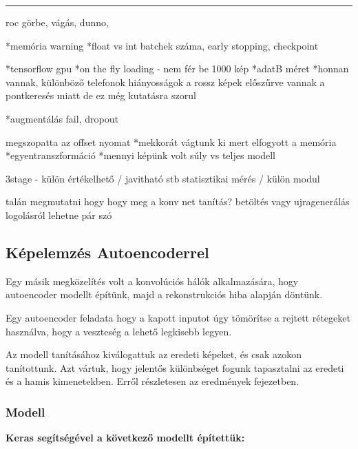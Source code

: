 \noindent\rule{15cm}{0.4pt}
roc görbe, vágás, dunno,


*memória warning
*float vs int
batchek száma, early stopping, checkpoint

*tensorflow gpu 
*on the fly loading - nem fér be 1000 kép
*adatB méret
*honnan vannak, különböző telefonok
hiányosságok
a rossz képek előszűrve vannak a pontkeresés miatt de ez még kutatásra szorul

*augmentálás fail, dropout

megszopatta az offset nyomat
*mekkorát vágtunk ki mert elfogyott a memória
*egyentranszformáció
*mennyi képünk volt
súly vs teljes modell

3stage - külön értékelhető / javitható stb
statisztikai mérés / külön modul

talán megmutatni hogy hogy meg a konv net tanítás?
betöltés vagy ujragenerálás
logolásról lehetne pár szó






\subsection{Képelemzés Autoencoderrel}


Egy másik megközelítés volt a konvolúciós hálók alkalmazására, hogy autoencoder modellt 
építünk, majd a rekonstrukciós hiba alapján döntünk.

Egy autoencoder feladata hogy a kapott inputot úgy tömörítse a rejtett rétegeket
használva, hogy a veszteség a lehető legkisebb legyen.

Az modell tanításához kiválogattuk az eredeti képeket, és csak azokon tanítottunk.
Azt vártuk, hogy jelentős különbséget fogunk tapasztalni az eredeti és a hamis 
kimenetekben. Erről részletesen az eredmények fejezetben.


\subsubsection{Modell}
\noindent
\textbf{Keras segítségével a következő modellt építettük:}


